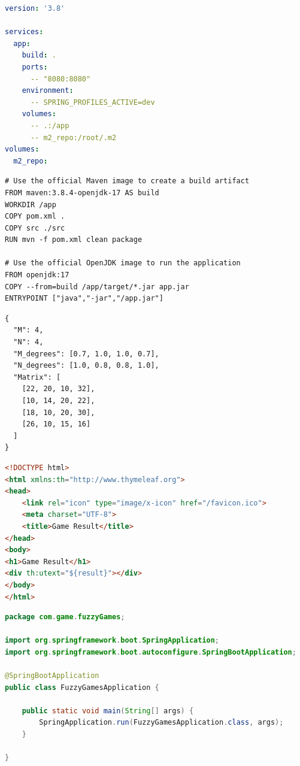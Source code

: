 \documentclass[14pt, a4paper, oneside]{extarticle}
\numberwithin{equation}{section}
\begin{document}
\begin{lstlisting}[language=yaml, caption=docker-compose.yaml]
version: '3.8'

services:
  app:
    build: .
    ports:
      -- "8080:8080"
    environment:
      -- SPRING_PROFILES_ACTIVE=dev
    volumes:
      -- .:/app
      -- m2_repo:/root/.m2
volumes:
  m2_repo:

\end{lstlisting}

\begin{lstlisting}[caption=Dockerfile]
# Use the official Maven image to create a build artifact
FROM maven:3.8.4-openjdk-17 AS build
WORKDIR /app
COPY pom.xml .
COPY src ./src
RUN mvn -f pom.xml clean package

# Use the official OpenJDK image to run the application
FROM openjdk:17
COPY --from=build /app/target/*.jar app.jar
ENTRYPOINT ["java","-jar","/app.jar"]

\end{lstlisting}

\begin{lstlisting}[caption=gameData.json]
{
  "M": 4,
  "N": 4,
  "M_degrees": [0.7, 1.0, 1.0, 0.7],
  "N_degrees": [1.0, 0.8, 0.8, 1.0],
  "Matrix": [
    [22, 20, 10, 32],
    [10, 14, 20, 22],
    [18, 10, 20, 30],
    [26, 10, 15, 16]
  ]
}
\end{lstlisting}

\begin{lstlisting}[language=html, caption=index.html]
<!DOCTYPE html>
<html xmlns:th="http://www.thymeleaf.org">
<head>
    <link rel="icon" type="image/x-icon" href="/favicon.ico">
    <meta charset="UTF-8">
    <title>Game Result</title>
</head>
<body>
<h1>Game Result</h1>
<div th:utext="${result}"></div>
</body>
</html>
\end{lstlisting}

\begin{lstlisting}[language=java, caption=FuzzyGamesApplication.java]
package com.game.fuzzyGames;

import org.springframework.boot.SpringApplication;
import org.springframework.boot.autoconfigure.SpringBootApplication;

@SpringBootApplication
public class FuzzyGamesApplication {

	public static void main(String[] args) {
		SpringApplication.run(FuzzyGamesApplication.class, args);
	}

}

\end{lstlisting}
\end{document}
